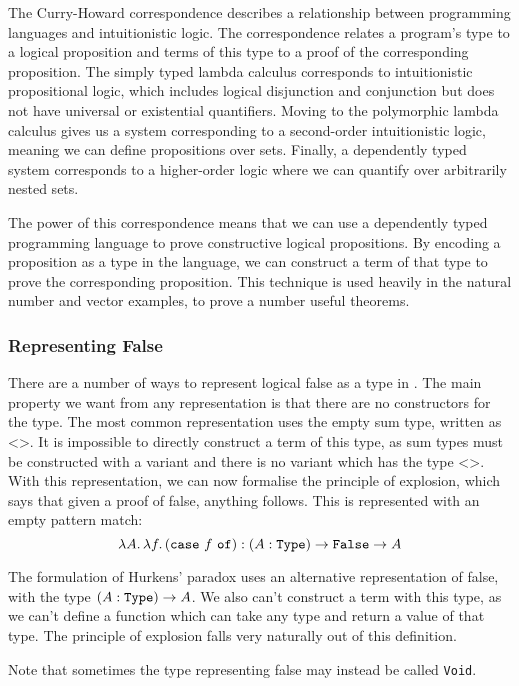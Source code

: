 \documentclass[12pt,a4paper,twoside]{report}
\begin{document}
The Curry-Howard correspondence \cite{howard80} describes a relationship between programming languages and intuitionistic logic.
The correspondence relates a program's type to a logical proposition and terms of this type to a proof of the corresponding proposition.
The simply typed lambda calculus corresponds to intuitionistic propositional logic, which includes logical disjunction and conjunction but does not have universal or existential quantifiers.
Moving to the polymorphic lambda calculus gives us a system corresponding to a second-order intuitionistic logic, meaning we can define propositions over sets.
Finally, a dependently typed system corresponds to a higher-order logic where we can quantify over arbitrarily nested sets.

The power of this correspondence means that we can use a dependently typed programming language to prove constructive logical propositions.
By encoding a proposition as a type in the language, we can construct a term of that type to prove the corresponding proposition.
This technique is used heavily in the natural number and vector examples, to prove a number useful theorems.

\subsubsection{Representing False}

There are a number of ways to represent logical false as a type in \pimu{}.
The main property we want from any representation is that there are no constructors for the type.
The most common representation uses the empty sum type, written as \(\texttt{<>}\).
It is impossible to directly construct a term of this type, as sum types must be constructed with a variant and there is no variant which has the type \(\texttt{<>}\).
With this representation, we can now formalise the principle of explosion, which says that given a proof of false, anything follows.
This is represented with an empty pattern match:
\[
    \annot{\fun{A}{\fun{f}{(\texttt{case}\ f\ \texttt{of})}}}{\pi{A}{\type}{\upi{\texttt{False}}{A}}}
\]

The formulation of Hurkens' paradox uses an alternative representation of false, with the type \((A : \mathtt{Type}) \rightarrow A\).
We also can't construct a term with this type, as we can't define a function which can take any type and return a value of that type.
The principle of explosion falls very naturally out of this definition.

Note that sometimes the type representing false may instead be called \texttt{Void}.
\end{document}
